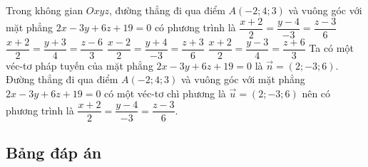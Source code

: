 \begin{ex}%
	Trong không gian $O x y z$, đường thẳng đi qua điểm $A(-2;4;3)$ và vuông góc với mặt phẳng $2x-3y+6z+19=0$ có phương trình là 
	\choice 
	{\True $\dfrac{x+2}{2}=\dfrac{y-4}{-3}=\dfrac{z-3}{6}$}
	{$\dfrac{x+2}{2}=\dfrac{y+3}{4}=\dfrac{z-6}{3}$}
	{$\dfrac{x-2}{2}=\dfrac{y+4}{-3}=\dfrac{z+3}{6}$}
	{$\dfrac{x+2}{2}=\dfrac{y-3}{4}=\dfrac{z+6}{3}$}
	\loigiai 
	{
Ta có một véc-tơ pháp tuyến của mặt phẳng $2x-3y+6z+19=0$ là $\vec{n}=(2;-3;6)$.\\
Đường thẳng đi qua điểm $A(-2;4;3)$ và vuông góc với mặt phẳng $2x-3y+6z+19=0$ có một véc-tơ chì phương là $\vec{u}=(2;-3;6)$ nên có phương trình là $\dfrac{x+2}{2}=\dfrac{y-4}{-3}=\dfrac{z-3}{6}$.	
	}
\end{ex}
\subsection{Bảng đáp án}


